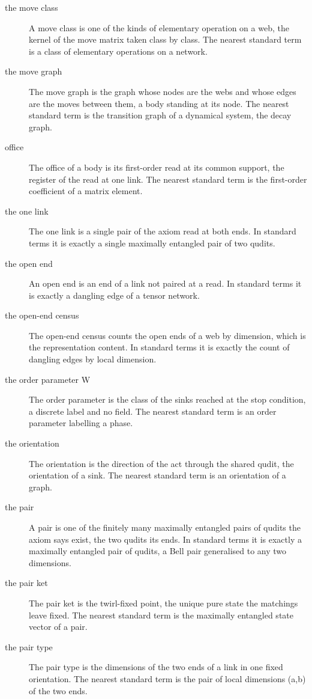 \begin{description}
\item[the move class] A move class is one of the kinds of elementary operation on a web, the kernel of the move matrix taken class by class. The nearest standard term is a class of elementary operations on a network.
\item[the move graph] The move graph is the graph whose nodes are the webs and whose edges are the moves between them, a body standing at its node. The nearest standard term is the transition graph of a dynamical system, the decay graph.
\item[office] The office of a body is its first-order read at its common support, the register of the read at one link. The nearest standard term is the first-order coefficient of a matrix element.
\item[the one link] The one link is a single pair of the axiom read at both ends. In standard terms it is exactly a single maximally entangled pair of two qudits.
\item[the open end] An open end is an end of a link not paired at a read. In standard terms it is exactly a dangling edge of a tensor network.
\item[the open-end census] The open-end census counts the open ends of a web by dimension, which is the representation content. In standard terms it is exactly the count of dangling edges by local dimension.
\item[the order parameter W] The order parameter is the class of the sinks reached at the stop condition, a discrete label and no field. The nearest standard term is an order parameter labelling a phase.
\item[the orientation] The orientation is the direction of the act through the shared qudit, the orientation of a sink. The nearest standard term is an orientation of a graph.
\item[the pair] A pair is one of the finitely many maximally entangled pairs of qudits the axiom says exist, the two qudits its ends. In standard terms it is exactly a maximally entangled pair of qudits, a Bell pair generalised to any two dimensions.
\item[the pair ket] The pair ket is the twirl-fixed point, the unique pure state the matchings leave fixed. The nearest standard term is the maximally entangled state vector of a pair.
\item[the pair type] The pair type is the dimensions of the two ends of a link in one fixed orientation. The nearest standard term is the pair of local dimensions (a,b) of the two ends.

\end{description}
